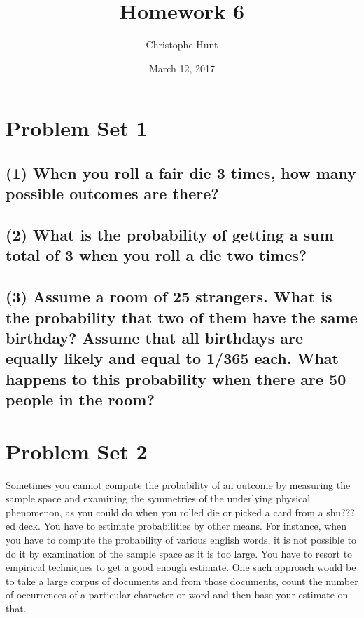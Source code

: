 \documentclass[]{article}
\title{Homework 6}
\author{Christophe Hunt}
\date{March 12, 2017}
\begin{document}
\maketitle

{
\setcounter{tocdepth}{2}
\tableofcontents
}
\section{Problem Set 1}\label{problem-set-1}

\subsection{(1) When you roll a fair die 3 times, how many possible
outcomes are
there?}\label{when-you-roll-a-fair-die-3-times-how-many-possible-outcomes-are-there}

\subsection{(2) What is the probability of getting a sum total of 3 when
you roll a die two
times?}\label{what-is-the-probability-of-getting-a-sum-total-of-3-when-you-roll-a-die-two-times}

\subsection{(3) Assume a room of 25 strangers. What is the probability
that two of them have the same birthday? Assume that all birthdays are
equally likely and equal to 1/365 each. What happens to this probability
when there are 50 people in the
room?}\label{assume-a-room-of-25-strangers.-what-is-the-probability-that-two-of-them-have-the-same-birthday-assume-that-all-birthdays-are-equally-likely-and-equal-to-1365-each.-what-happens-to-this-probability-when-there-are-50-people-in-the-room}

\section{Problem Set 2}\label{problem-set-2}

Sometimes you cannot compute the probability of an outcome by measuring
the sample space and examining the symmetries of the underlying physical
phenomenon, as you could do when you rolled die or picked a card from a
shu???ed deck. You have to estimate probabilities by other means. For
instance, when you have to compute the probability of various english
words, it is not possible to do it by examination of the sample space as
it is too large. You have to resort to empirical techniques to get a
good enough estimate. One such approach would be to take a large corpus
of documents and from those documents, count the number of occurrences
of a particular character or word and then base your estimate on that.
\end{document}
